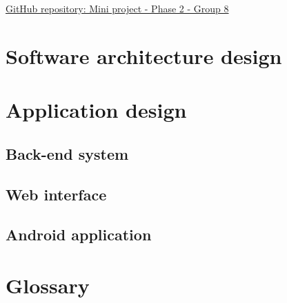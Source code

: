 \documentclass[12pt]{article}
\begin{document}
	\vspace{0.5in}
	
	\begin{flushleft}
		\LARGE\href{https://github.com/mox1990/COS_301_GROUP8_Phase_2}{GitHub repository: Mini project - Phase 2 -  Group 8}
	\end{flushleft}
	
	\newpage
	\section{Software architecture design}
	
		\vspace{0.2in}
		
		
		
	\section{Application design}
	
		\vspace{0.2in}
		
		
		
	\subsection{Back-end system}

		\vspace{0.2in}
		
		
		
		
	\subsection{Web interface}

	\vspace{0.2in}
	
	
	\newpage
	\subsection{Android application}
			
	\vspace{0.2in}
	
	
	
	
	\vspace{0.2in}

	
	\newpage	
	\section{Glossary}
	
\end{document}
